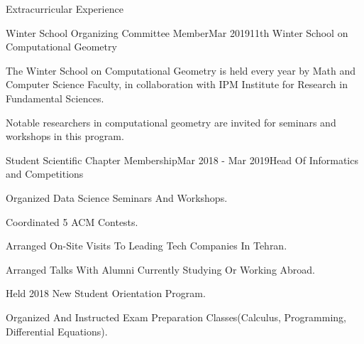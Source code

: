 \documentclass{resume} %
\begin{document}
	\begin{rSection}{Extracurricular Experience}
		\begin{rSubsection}{Winter School Organizing Committee Member}{Mar 2019}{11th Winter School on Computational Geometry}{ }
			\item 	The Winter School on Computational Geometry is held every year by Math and Computer Science Faculty, in collaboration with IPM Institute for Research in Fundamental Sciences.
			\item Notable researchers in computational geometry are invited for seminars and workshops in this program.
		\end{rSubsection}
		\begin{rSubsection}{Student Scientific Chapter Membership}{Mar 2018 - Mar  2019}{Head Of Informatics and Competitions}{ }
			\item Organized Data Science Seminars And Workshops.
			\item Coordinated 5 ACM Contests.
			\item Arranged On-Site Visits To Leading Tech Companies In Tehran.
			\item Arranged Talks With Alumni Currently Studying Or Working Abroad.
			\item Held 2018 New Student Orientation Program.
			\item Organized And Instructed Exam Preparation Classes(Calculus, Programming, Differential Equations).
		\end{rSubsection}
		
	\end{rSection}
	
\end{document}
